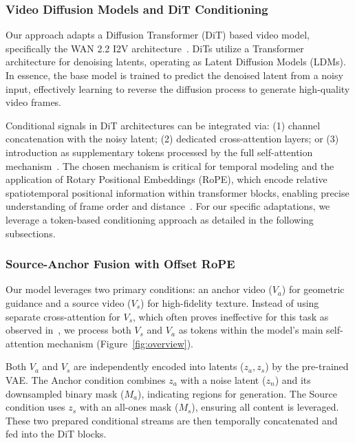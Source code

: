 \subsubsection{Video Diffusion Models and DiT Conditioning}
\label{sec:arch_background}

Our approach adapts a Diffusion Transformer (DiT) based video model, specifically the WAN 2.2 I2V architecture~\cite{wan21}. DiTs utilize a Transformer architecture for denoising latents, operating as Latent Diffusion Models (LDMs). In essence, the base model is trained to predict the denoised latent from a noisy input, effectively learning to reverse the diffusion process to generate high-quality video frames.


Conditional signals in DiT architectures can be integrated via: (1) channel concatenation with the noisy latent; (2) dedicated cross-attention layers; or (3) introduction as supplementary tokens processed by the full self-attention mechanism~\cite{bai2025recammaster, peebles2023scalable}. The chosen mechanism is critical for temporal modeling and the application of Rotary Positional Embeddings (RoPE), which encode relative spatiotemporal positional information within transformer blocks, enabling precise understanding of frame order and distance~\cite{bai2025recammaster, su2024roformer}. For our specific adaptations, we leverage a token-based conditioning approach as detailed in the following subsections.

\subsubsection{Source-Anchor Fusion with Offset RoPE}
\label{sec:offset_rope}

Our model leverages two primary conditions: an anchor video ($V_a$) for geometric guidance and a source video ($V_s$) for high-fidelity texture. Instead of using separate cross-attention for $V_s$, which often proves ineffective for this task as observed in~\cite{bai2025recammaster}, we process both $V_s$ and $V_a$ as tokens within the model's main self-attention mechanism (Figure~\ref{fig:overview}).

Both $V_a$ and $V_s$ are independently encoded into latents ($z_a, z_s$) by the pre-trained VAE. The Anchor condition combines $z_a$ with a noise latent ($z_n$) and its downsampled binary mask ($M_a$), indicating regions for generation. The Source condition uses $z_s$ with an all-ones mask ($M_s$), ensuring all content is leveraged. These two prepared conditional streams are then temporally concatenated and fed into the DiT blocks.

